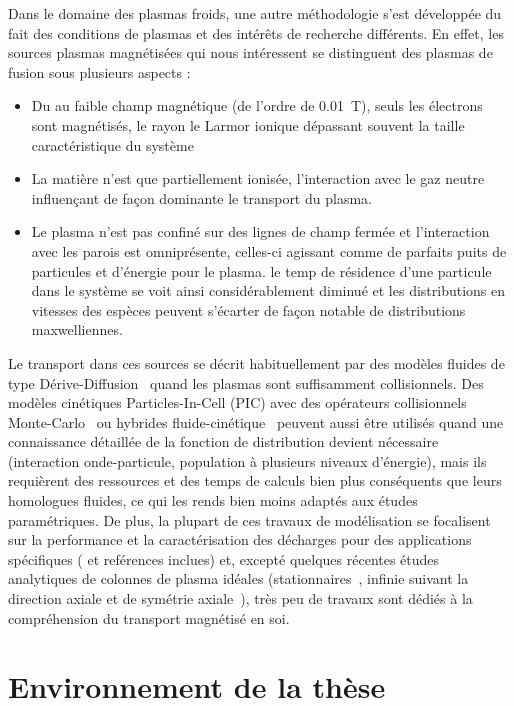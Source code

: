 \begin{refsection}
Dans le domaine des plasmas froids, une autre méthodologie s'est développée du
fait des conditions de plasmas et des intérêts de recherche
différents. En effet, les sources plasmas magnétisées qui nous intéressent
se distinguent des plasmas de fusion sous plusieurs aspects :

\begin{itemize}
  \item Du au faible champ magnétique (de l'ordre de 0.01~T), seuls
  les électrons sont magnétisés, le rayon le Larmor ionique dépassant souvent la
  taille caractéristique du système
  \item La matière n'est que partiellement ionisée, l'interaction avec
  le gaz neutre influençant de façon dominante le transport du plasma.
  \item Le plasma n'est pas confiné sur des lignes de champ fermée et
  l'interaction avec les parois est omniprésente, celles-ci agissant comme de
  parfaits puits de particules et d'énergie pour le plasma.
  le temp de résidence d'une particule dans le système se voit
  ainsi considérablement diminué et les distributions en vitesses des
  espèces peuvent s'écarter de façon notable de distributions maxwelliennes.
\end{itemize}

Le transport dans ces sources se décrit habituellement par des modèles fluides
de type Dérive-Diffusion~\parencite{Porteous,Lieberman,Rozhansky} quand les
plasmas sont suffisamment collisionnels. Des modèles
cinétiques Particles-In-Cell (PIC) avec des opérateurs collisionnels
Monte-Carlo~\parencite{PIC3D,Adam} ou hybrides
fluide-cinétique~\parencite{BoeufGarrigues} peuvent aussi être utilisés quand
une connaissance détaillée de la fonction de distribution devient nécessaire
(interaction onde-particule, population à plusieurs niveaux d'énergie), mais
ils requièrent des ressources et des temps de calculs bien plus conséquents que
leurs homologues fluides, ce qui les rends bien moins adaptés aux études
paramétriques. De plus, la plupart de ces travaux de modélisation se focalisent
sur la performance et la caractérisation des décharges pour des applications
spécifiques (\parencite{Lieberman} et reférences inclues) et, excepté quelques
récentes études analytiques de colonnes de plasma idéales
(stationnaires~\parencite{Sternberg}, infinie suivant la direction axiale et de
symétrie axiale~\parencite{Fruchtman}), très peu de travaux sont dédiés à la
compréhension du transport magnétisé en soi.


\section{Environnement de la thèse}


\end{refsection}
